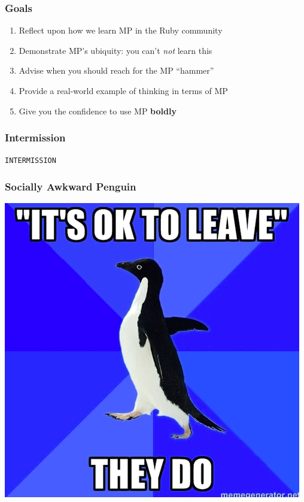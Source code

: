 \documentclass[slidestop,compress,mathserif]{beamer}
\begin{document}
\begin{frame}
	\frametitle{Goals}
	\begin{enumerate}
		\item Reflect upon how we learn MP in the Ruby community
		\pause
		\item Demonstrate MP's ubiquity:  you can't \emph{not} learn this
		\pause
		\item Advise when you should reach for the MP ``hammer''
		\pause
		\item Provide a real-world example of thinking in terms of MP
		\pause
		\item Give you the confidence to use MP \textbf{boldly}
	\end{enumerate}
\end{frame}

\begin{frame}
	\frametitle{Intermission}
	\begin{center}
		\texttt{INTERMISSION}
	\end{center}
\end{frame}

\begin{frame}
	\frametitle{Socially Awkward Penguin}
	\begin{center}
		\includegraphics[scale=0.3]{img/sap.png}			
	\end{center}	
\end{frame}
\end{document}
